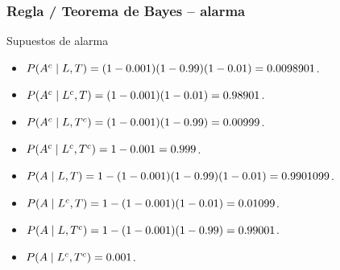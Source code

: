 \documentclass[table]{beamer}
\begin{document}
\begin{frame}
    \frametitle{Regla / Teorema de Bayes -- alarma}
    \begin{block}{Supuestos de alarma}
        \begin{itemize}
            \item $\prob{A^{c} \mid L, T} = \parens{1 - 0.001} \parens{1 - 0.99} \parens{1 - 0.01} = 0.0098901$.
            \item $\prob{A^{c} \mid L^{c}, T} = \parens{1 - 0.001} \parens{1 - 0.01} = 0.98901$.
            \item $\prob{A^{c} \mid L, T^{c}} = \parens{1 - 0.001} \parens{1 - 0.99} = 0.00999$.
            \item $\prob{A^{c} \mid L^{c}, T^{c}} = 1 - 0.001 = 0.999$.
            \item $\prob{A \mid L, T} = 1 - \parens{1 - 0.001} \parens{1 - 0.99} \parens{1 - 0.01} = 0.9901099$.
            \item $\prob{A \mid L^{c}, T} = 1 - \parens{1 - 0.001} \parens{1 - 0.01} = 0.01099$.
            \item $\prob{A \mid L, T^{c}} = 1 - \parens{1 - 0.001} \parens{1 - 0.99} = 0.99001$.
            \item $\prob{A \mid L^{c}, T^{c}} = 0.001$.
        \end{itemize}
    \end{block}
\end{frame}
\end{document}
